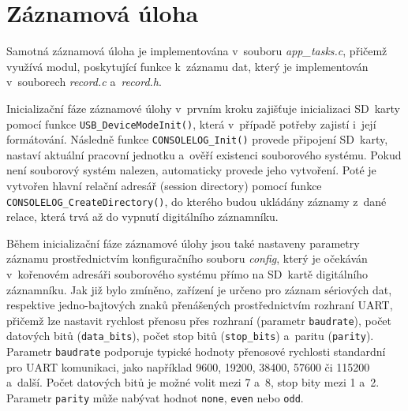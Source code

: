 \newpage

\section{Záznamová úloha}
\label{zaznamove_vlakno}
Samotná záznamová úloha je implementována v~souboru \textit{app\_tasks.c}, přičemž využívá modul, poskytující funkce k~záznamu dat, který je implementován v~souborech \textit{record.c} a~\textit{record.h}. 

Inicializační fáze záznamové úlohy v~prvním kroku zajišťuje inicializaci SD~karty pomocí funkce \texttt{USB\_DeviceModeInit()}, která v~případě potřeby zajistí i~její formátování. Následně funkce \texttt{CONSOLELOG\_Init()} provede připojení SD~karty, nastaví aktuální pracovní jednotku a~ověří existenci souborového systému. Pokud není souborový systém nalezen, automaticky provede jeho vytvoření. Poté je vytvořen hlavní relační adresář (session directory) pomocí funkce \texttt{CONSOLELOG\_CreateDirectory()}, do kterého budou ukládány záznamy z~dané relace, která trvá až do vypnutí digitálního záznamníku.


Během inicializační fáze záznamové úlohy jsou také nastaveny parametry záznamu prostřednictvím konfiguračního souboru \textit{config}, který je očekáván v~kořenovém adresáři souborového systému přímo na SD~kartě digitálního záznamníku. Jak již bylo zmíněno, zařízení je určeno pro záznam sériových dat, respektive jedno-bajtových znaků přenášených prostřednictvím rozhraní UART, přičemž lze nastavit rychlost přenosu přes rozhraní (parametr \texttt{baudrate}), počet datových bitů (\texttt{data\_bits}), počet stop bitů (\texttt{stop\_bits}) a~paritu (\texttt{parity}). Parametr \texttt{baudrate} podporuje typické hodnoty přenosové rychlosti standardní pro UART komunikaci, jako například 9600, 19200, 38400, 57600 či 115200 a~další. Počet datových bitů je možné volit mezi 7 a~8, stop bity mezi 1 a~2. Parametr \texttt{parity} může nabývat hodnot \texttt{none}, \texttt{even} nebo \texttt{odd}.

